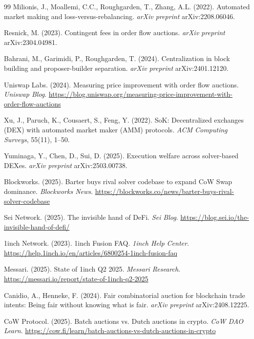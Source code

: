 \documentclass[12pt,a4paper]{article}
\begin{document}
\begin{thebibliography}{99}
Milionis, J., Moallemi, C.C., Roughgarden, T., Zhang, A.L. (2022). Automated market making and loss-versus-rebalancing. \textit{arXiv preprint} arXiv:2208.06046.

Resnick, M. (2023). Contingent fees in order flow auctions. \textit{arXiv preprint} arXiv:2304.04981.

Bahrani, M., Garimidi, P., Roughgarden, T. (2024). Centralization in block building and proposer-builder separation. \textit{arXiv preprint} arXiv:2401.12120.

Uniswap Labs. (2024). Measuring price improvement with order flow auctions. \textit{Uniswap Blog}. \url{https://blog.uniswap.org/measuring-price-improvement-with-order-flow-auctions}

Xu, J., Paruch, K., Cousaert, S., Feng, Y. (2022). SoK: Decentralized exchanges (DEX) with automated market maker (AMM) protocols. \textit{ACM Computing Surveys}, 55(11), 1--50.

Yuminaga, Y., Chen, D., Sui, D. (2025). Execution welfare across solver-based DEXes. \textit{arXiv preprint} arXiv:2503.00738.

Blockworks. (2025). Barter buys rival solver codebase to expand CoW Swap dominance. \textit{Blockworks News}. \url{https://blockworks.co/news/barter-buys-rival-solver-codebase}

Sei Network. (2025). The invisible hand of DeFi. \textit{Sei Blog}. \url{https://blog.sei.io/the-invisible-hand-of-defi/}

1inch Network. (2023). 1inch Fusion FAQ. \textit{1inch Help Center}. \url{https://help.1inch.io/en/articles/6800254-1inch-fusion-faq}

Messari. (2025). State of 1inch Q2 2025. \textit{Messari Research}. \url{https://messari.io/report/state-of-1inch-q2-2025}

Canidio, A., Henneke, F. (2024). Fair combinatorial auction for blockchain trade intents: Being fair without knowing what is fair. \textit{arXiv preprint} arXiv:2408.12225.

CoW Protocol. (2025). Batch auctions vs. Dutch auctions in crypto. \textit{CoW DAO Learn}. \url{https://cow.fi/learn/batch-auctions-vs-dutch-auctions-in-crypto}


\end{thebibliography}
\end{document}
